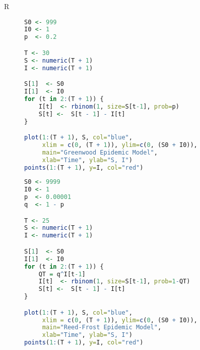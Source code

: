 
\begin{description}



\item[R] 


\begin{lstlisting}[language=R]
S0 <- 999
I0 <- 1
p  <- 0.2

T <- 30
S <- numeric(T + 1)
I <- numeric(T + 1)

S[1]  <- S0
I[1]  <- I0
for (t in 2:(T + 1)) {
    I[t]  <- rbinom(1, size=S[t-1], prob=p)
    S[t] <-  S[t - 1] - I[t]
}

plot(1:(T + 1), S, col="blue",
     xlim = c(0, (T + 1)), ylim=c(0, (S0 + I0)),
     main="Greenwood Epidemic Model",
     xlab="Time", ylab="S, I")
points(1:(T + 1), y=I, col="red")
\end{lstlisting}


\begin{lstlisting}[language=R]
S0 <- 9999
I0 <- 1
p  <- 0.00001
q  <- 1 - p

T <- 25
S <- numeric(T + 1)
I <- numeric(T + 1)

S[1]  <- S0
I[1]  <- I0
for (t in 2:(T + 1)) {
    QT = q^I[t-1]
    I[t]  <- rbinom(1, size=S[t-1], prob=1-QT)
    S[t] <-  S[t - 1] - I[t]
}

plot(1:(T + 1), S, col="blue",
     xlim = c(0, (T + 1)), ylim=c(0, (S0 + I0)),
     main="Reed-Frost Epidemic Model",
     xlab="Time", ylab="S, I")
points(1:(T + 1), y=I, col="red")
\end{lstlisting}













\end{description}



